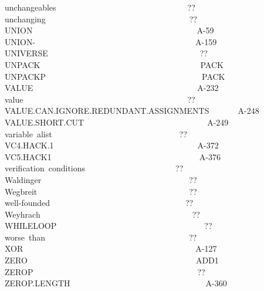 \documentclass[11pt]{book}
\newenvironment{pubasis}{\begin{flushleft}\ttfamily\small}{\normalsize\rmfamily\end{flushleft}}
\begin{document}
\begin{pubasis}
unchangeables~~~~~~~~~~~~~~~~~~~~~~~~~~~~~~~~??\\
unchanging~~~~~~~~~~~~~~~~~~~~~~~~~~~~~~~~~~~??\\
UNION~~~~~~~~~~~~~~~~~~~~~~~~~~~~~~~~~~~~~~~~A-59\\
UNION-~~~~~~~~~~~~~~~~~~~~~~~~~~~~~~~~~~~~~~~A-159\\
UNIVERSE~~~~~~~~~~~~~~~~~~~~~~~~~~~~~~~~~~~~~??\\
UNPACK~~~~~~~~~~~~~~~~~~~~~~~~~~~~~~~~~~~~~~~PACK\\
UNPACKP~~~~~~~~~~~~~~~~~~~~~~~~~~~~~~~~~~~~~~PACK\\
VALUE~~~~~~~~~~~~~~~~~~~~~~~~~~~~~~~~~~~~~~~~A-232\\
value~~~~~~~~~~~~~~~~~~~~~~~~~~~~~~~~~~~~~~~~??\\
VALUE.CAN.IG\-NORE.RE\-DUN\-DANT.ASSIGN\-MENTS~~~~~~~A-248\\
VALUE.SHORT.CUT~~~~~~~~~~~~~~~~~~~~~~~~~~~~~~A-249\\
variable~alist~~~~~~~~~~~~~~~~~~~~~~~~~~~~~~~??\\
VC4.HACK.1~~~~~~~~~~~~~~~~~~~~~~~~~~~~~~~~~~~A-372\\
VC5.HACK1~~~~~~~~~~~~~~~~~~~~~~~~~~~~~~~~~~~~A-376\\
verification~conditions~~~~~~~~~~~~~~~~~~~~~~??\\
Waldinger~~~~~~~~~~~~~~~~~~~~~~~~~~~~~~~~~~~~??\\
Wegbreit~~~~~~~~~~~~~~~~~~~~~~~~~~~~~~~~~~~~~??\\
well-founded~~~~~~~~~~~~~~~~~~~~~~~~~~~~~~~~~??\\
Weyhrach~~~~~~~~~~~~~~~~~~~~~~~~~~~~~~~~~~~~~??\\
WHILELOOP~~~~~~~~~~~~~~~~~~~~~~~~~~~~~~~~~~~~??\\
worse~than~~~~~~~~~~~~~~~~~~~~~~~~~~~~~~~~~~~??\\
XOR~~~~~~~~~~~~~~~~~~~~~~~~~~~~~~~~~~~~~~~~~~A-127\\
ZERO~~~~~~~~~~~~~~~~~~~~~~~~~~~~~~~~~~~~~~~~~ADD1\\
ZEROP~~~~~~~~~~~~~~~~~~~~~~~~~~~~~~~~~~~~~~~~??\\
ZEROP.LENGTH~~~~~~~~~~~~~~~~~~~~~~~~~~~~~~~~~A-360\\
\end{pubasis}
\cleardoublepage
{}
\end{document}
